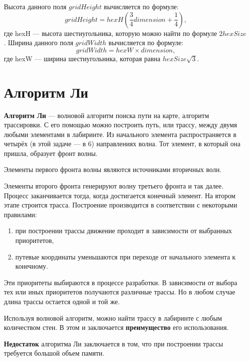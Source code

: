 Высота данного поля $gridHeight$ вычисляется по формуле: 
\begin{equation}
\label{hexGrid:gridHeight}
	gridHeight=hexH(\frac{3}{4}dimension+\frac{1}{4}),
\end{equation} 
где hexH --- высота шестиугольника, которую можно найти по формуле $2hexSize$. 
Ширина данного поля $gridWidth$ вычисляется по формуле: 
\begin{equation}
\label{hexGrid:gridWidth}
gridWidth=hexW\times dimension, 
\end{equation}
где hexW --- ширина 
шестиугольника, которая равна $hexSize\sqrt{3}$.

\section{Алгоритм Ли}
\label{analysis:li}

 \textbf{Алгоритм Ли} — волновой алгоритм поиска пути на карте, алгоритм трассировки. С его помощью можно построить путь, или трассу, между двумя любыми элементами в лабиринте. Из начального элемента распространяется в четырёх (в этой задаче — в 6) направлениях волна. Тот элемент, в который она пришла, образует фронт волны.

Элементы первого фронта волны являются источниками вторичных волн.

Элементы второго фронта генерируют волну третьего фронта и так далее. Процесс заканчивается тогда, когда достигается конечный элемент. На втором этапе строится трасса. Построение производится в соответствии с некоторыми правилами:
\begin{enumerate}
	\item при построении трассы движение проходит в зависимости от выбранных приоритетов,
	\item путевые координаты уменьшаются при переходе от начального элемента к конечному.
\end{enumerate}
Эти приоритеты выбираются в процессе разработки. В зависимости от выбора тех или иных приоритетов получаются различные трассы. Но в любом случае длина трассы остается одной и той же.

Используя волновой алгоритм, можно найти трассу в лабиринте с любым количеством стен. В этом и заключается \textbf{преимущество} его использования.

\textbf{Недостаток} алгоритма Ли заключается в том, что при построении трассы требуется большой объем памяти.






































